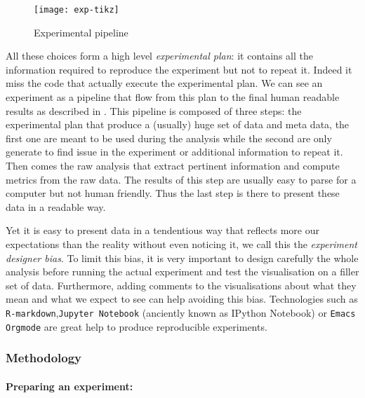 \begin{figure}[htb]
    \centering
    \texttt{[image: exp-tikz]}
    \caption{Experimental pipeline}
    \label{fig:exp-pipeline}
\end{figure}

All these choices form a high level \emph{experimental plan}: it contains all
the information required to reproduce the experiment but not to repeat it.
Indeed it miss the code that actually execute the experimental plan.
We can see an experiment as a pipeline that flow from this plan to the final
human readable results as described in . This pipeline is
composed of three steps: the experimental plan that produce a (usually) huge
set of data and meta data, the first one are meant to be used during the
analysis while the second are only generate to find issue in the experiment or
additional information to repeat it. Then comes the raw analysis that extract
pertinent information and compute metrics from the raw data. The results of
this step are usually easy to parse for a computer but not human friendly.
Thus the last step is there to present these data in a readable way.

Yet it is easy to present data in a tendentious way that reflects more our
expectations than the reality without even noticing it, we call this the
\emph{experiment designer bias}. To limit this bias,
it is very important to design carefully the whole analysis before running the
actual experiment and test the visualisation on a filler set of data.
Furthermore, adding comments to the visualisations about what they mean and
what we expect to see can help avoiding this bias. Technologies such as
\texttt{R-markdown},\texttt{Jupyter Notebook} (anciently known as IPython
Notebook) or \texttt{Emacs Orgmode} are great help to produce reproducible
experiments.

\subsubsection{Methodology}

\paragraph{Preparing an experiment:}

